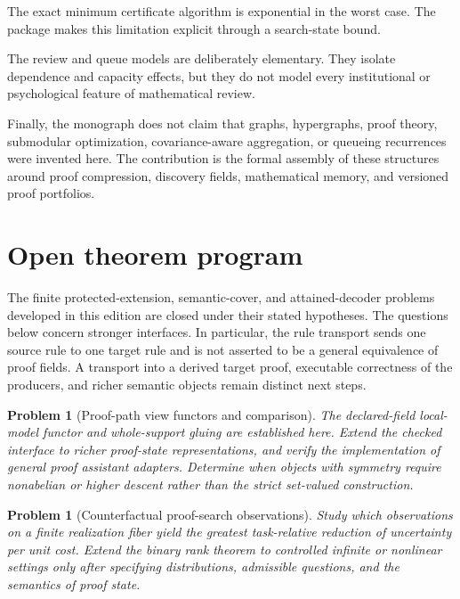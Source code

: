 \documentclass[11pt,oneside]{article}
\theoremstyle{komorebiplain}
\theoremstyle{komorebidefinition}
\newtheorem{problem}[theorem]{Problem}
\theoremstyle{komorebiremark}
\begin{document}
The exact minimum certificate algorithm is exponential in the worst case. The package makes this limitation explicit through a search-state bound.

The review and queue models are deliberately elementary. They isolate dependence and capacity effects, but they do not model every institutional or psychological feature of mathematical review.

Finally, the monograph does not claim that graphs, hypergraphs, proof theory, submodular optimization, covariance-aware aggregation, or queueing recurrences were invented here. The contribution is the formal assembly of these structures around proof compression, discovery fields, mathematical memory, and versioned proof portfolios.


\section{Open theorem program}
\label{sec:old28}

The finite protected-extension, semantic-cover, and attained-decoder problems developed in this edition are closed under their stated hypotheses. The questions below concern stronger interfaces. In particular, the rule transport sends one source rule to one target rule and is not asserted to be a general equivalence of proof fields. A transport into a derived target proof, executable correctness of the producers, and richer semantic objects remain distinct next steps.


\begin{problem}[Proof-path view functors and comparison]
\label{res:28:1}
The declared-field local-model functor and whole-support gluing are established here. Extend the checked interface to richer proof-state representations, and verify the implementation of general proof assistant adapters. Determine when objects with symmetry require nonabelian or higher descent rather than the strict set-valued construction.
\end{problem}

\begin{problem}[Counterfactual proof-search observations]
\label{res:28:2}
Study which observations on a finite realization fiber yield the greatest task-relative reduction of uncertainty per unit cost. Extend the binary rank theorem to controlled infinite or nonlinear settings only after specifying distributions, admissible questions, and the semantics of proof state.
\end{problem}
\end{document}
